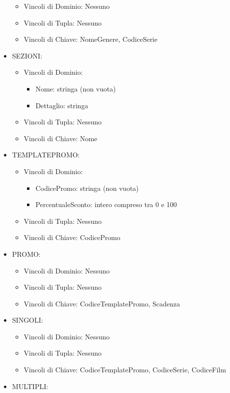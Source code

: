 \documentclass[a4paper,12pt]{report}
\begin{document}
\begin{itemize}
	\begin{itemize}
		\item Vincoli di Dominio: Nessuno
		\item Vincoli di Tupla: Nessuno
		\item Vincoli di Chiave: NomeGenere, CodiceSerie
	\end{itemize}
	\item SEZIONI:
	\begin{itemize}
		\item Vincoli di Dominio:
		\begin{itemize}
			\item Nome: stringa (non vuota)
			\item Dettaglio: stringa
		\end{itemize}
		\item Vincoli di Tupla: Nessuno
		\item Vincoli di Chiave: Nome
	\end{itemize}
	\item TEMPLATEPROMO:
	\begin{itemize}
		\item Vincoli di Dominio:
		\begin{itemize}
			\item CodicePromo: stringa (non vuota)
			\item PercentualeSconto: intero compreso tra 0 e 100
		\end{itemize}
		\item Vincoli di Tupla: Nessuno
		\item Vincoli di Chiave: CodicePromo
	\end{itemize}
	\item PROMO:
	\begin{itemize}
		\item Vincoli di Dominio: Nessuno
		\item Vincoli di Tupla: Nessuno
		\item Vincoli di Chiave: CodiceTemplatePromo, Scadenza
	\end{itemize}
	\item SINGOLI:
	\begin{itemize}
		\item Vincoli di Dominio: Nessuno
		\item Vincoli di Tupla: Nessuno
		\item Vincoli di Chiave: CodiceTemplatePromo, CodiceSerie, CodiceFilm
	\end{itemize}
	\item MULTIPLI:
	\begin{itemize}

\end{itemize}
\end{itemize}
\end{document}
